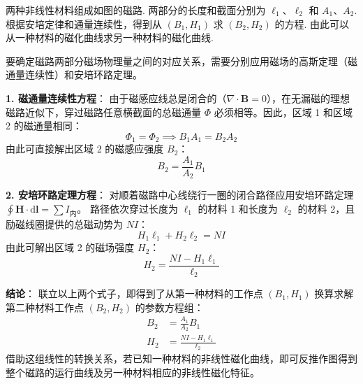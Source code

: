 \begin{exercise}\label{ex:19.10}
两种非线性材料组成如图的磁路. 两部分的长度和截面分别为 $\ell_1$、$\ell_2$ 和 $A_1$、$A_2$. 根据安培定律和通量连续性，得到从 $(B_1, H_1)$ 求 $(B_2, H_2)$ 的方程. 由此可以从一种材料的磁化曲线求另一种材料的磁化曲线.
\begin{center}
\end{center}
\end{exercise}
\begin{solution}
要确定磁路两部分磁场物理量之间的对应关系，需要分别应用磁场的高斯定理（磁通量连续性）和安培环路定理。

\textbf{1. 磁通量连续性方程}：
由于磁感应线总是闭合的（$\nabla \cdot \boldsymbol{B} = 0$），在无漏磁的理想磁路近似下，穿过磁路任意横截面的总磁通量 $\Phi$ 必须相等。因此，区域 1 和区域 2 的磁通量相同：
$$ \Phi_1 = \Phi_2 \implies B_1 A_1 = B_2 A_2 $$
由此可直接解出区域 2 的磁感应强度 $B_2$：
$$ B_2 = \frac{A_1}{A_2} B_1 $$

\textbf{2. 安培环路定理方程}：
对顺着磁路中心线绕行一圈的闭合路径应用安培环路定理 $\oint \boldsymbol{H} \cdot \mathrm{d}\boldsymbol{l} = \sum I_{\text{内}}$。
路径依次穿过长度为 $\ell_1$ 的材料 1 和长度为 $\ell_2$ 的材料 2，且励磁线圈提供的总磁动势为 $NI$：
$$ H_1 \ell_1 + H_2 \ell_2 = N I $$
由此可解出区域 2 的磁场强度 $H_2$：
$$ H_2 = \frac{N I - H_1 \ell_1}{\ell_2} $$

\textbf{结论}：
联立以上两个式子，即得到了从第一种材料的工作点 $(B_1, H_1)$ 换算求解第二种材料工作点 $(B_2, H_2)$ 的参数方程组：
\begin{align*}
    B_2 &= \frac{A_1}{A_2} B_1 \\
    H_2 &= \frac{N I - H_1 \ell_1}{\ell_2}
\end{align*}
借助这组线性的转换关系，若已知一种材料的非线性磁化曲线，即可反推作图得到整个磁路的运行曲线及另一种材料相应的非线性磁化特征。
\end{solution}

